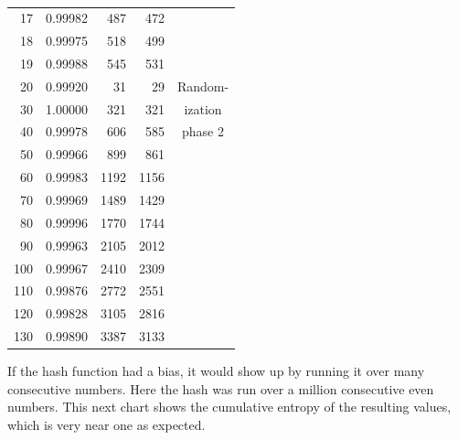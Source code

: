 \documentclass[letterpaper]{article}
\begin{document}
\begin{multicols}{2}
\begin{table}[ht]
\begin{tabular}{|r|r|r|r|c|}
            17                 & 0.99982          & 487           & 472            &                  \\
            18                 & 0.99975          & 518           & 499            &                  \\
            19                 & 0.99988          & 545           & 531            &                  \\
            \hline
            20                 & 0.99920          & 31            & 29             & Random-    \\
            30                 & 1.00000          & 321           & 321            & ization          \\
            40                 & 0.99978          & 606           & 585            & phase 2                 \\
            50                 & 0.99966          & 899           & 861            &                  \\
            60                 & 0.99983          & 1192          & 1156           &                  \\
            70                 & 0.99969          & 1489          & 1429           &                  \\
            80                 & 0.99996          & 1770          & 1744           &                  \\
            90                 & 0.99963          & 2105          & 2012           &                  \\
            100                & 0.99967          & 2410          & 2309           &                  \\
            110                & 0.99876          & 2772          & 2551           &                  \\
            120                & 0.99828          & 3105          & 2816           &                  \\
            130                & 0.99890          & 3387          & 3133           &                  \\
            \hline
        \end{tabular}
        \caption{}
    \end{table}

    If the hash function had a bias, it would show up by running it over many consecutive numbers. Here the hash was run over a million consecutive even numbers. This next chart shows the cumulative entropy of the resulting values, which is very near one as expected.


\end{multicols}
\end{document}
